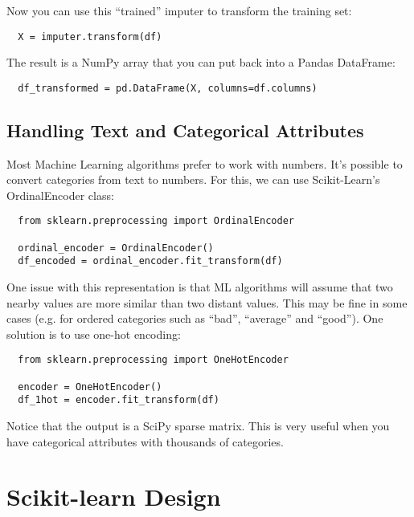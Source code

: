 \documentclass[french]{article}
\begin{document}
Now you can use this ``trained'' imputer to transform the training set:
\begin{lstlisting}
  X = imputer.transform(df)
\end{lstlisting}

The result is a NumPy array that you can put back into a Pandas DataFrame:
\begin{lstlisting}
  df_transformed = pd.DataFrame(X, columns=df.columns)
\end{lstlisting}

\subsection{Handling Text and Categorical Attributes}

Most Machine Learning algorithms prefer to work with numbers. It's possible to convert categories from text to numbers. For this, we can use Scikit-Learn's OrdinalEncoder class:
\begin{lstlisting}
  from sklearn.preprocessing import OrdinalEncoder

  ordinal_encoder = OrdinalEncoder()
  df_encoded = ordinal_encoder.fit_transform(df)
\end{lstlisting}

One issue with this representation is that ML algorithms will assume that two nearby values are more similar than two distant values. This may be fine in some cases (e.g. for ordered categories such as ``bad'', ``average'' and ``good''). One solution is to use one-hot encoding:
\begin{lstlisting}
  from sklearn.preprocessing import OneHotEncoder

  encoder = OneHotEncoder()
  df_1hot = encoder.fit_transform(df) 
\end{lstlisting}

Notice that the output is a SciPy sparse matrix. This is very useful when you have categorical attributes with thousands of categories.

\section{Scikit-learn Design}
\end{document}
